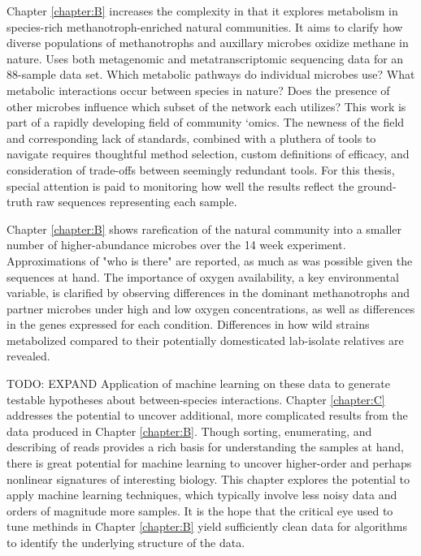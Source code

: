 Chapter \ref{chapter:B} increases the complexity in that it explores metabolism in species-rich methanotroph-enriched natural communities.
It aims to clarify how diverse populations of methanotrophs and auxillary microbes oxidize methane in nature.
Uses both metagenomic and metatranscriptomic sequencing data for an 88-sample data set.
Which metabolic pathways do individual microbes use?
What metabolic interactions occur between species in nature?
Does the presence of other microbes influence which subset of the network each utilizes?
This work is part of a rapidly developing field of community `omics.
The newness of the field and corresponding lack of standards, combined with a pluthera of tools to navigate requires thoughtful method selection, custom definitions of efficacy, and consideration of trade-offs between seemingly redundant tools.
For this thesis, special attention is paid to monitoring how well the results reflect the ground-truth raw sequences representing each sample.


Chapter \ref{chapter:B}  shows rarefication of the natural community into a smaller number of higher-abundance microbes over the 14 week experiment.
Approximations of "who is there" are reported, as much as was possible given the sequences at hand.
The importance of oxygen availability, a key environmental variable, is clarified by observing differences in the dominant methanotrophs and partner microbes under high and low oxygen concentrations, as well as differences in the genes expressed for each condition.
Differences in how wild strains metabolized compared to their potentially domesticated lab-isolate relatives are revealed.

TODO: EXPAND Application of machine learning on these data to generate testable hypotheses about between-species interactions.
Chapter \ref{chapter:C} addresses the potential to uncover additional, more complicated results from the data produced in Chapter \ref{chapter:B}.
Though sorting, enumerating, and describing of reads provides a rich basis for understanding the samples at hand, there is great potential for machine learning to uncover higher-order and perhaps nonlinear signatures of interesting biology.
This chapter explores the potential to apply machine learning techniques, which typically involve less noisy data and orders of magnitude more samples.
It is the hope that the critical eye used to tune methinds in Chapter \ref{chapter:B} yield sufficiently clean data for algorithms to identify the underlying structure of the data.




